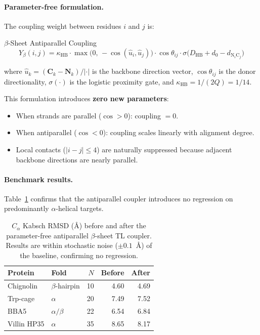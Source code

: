 \paragraph{Parameter-free formulation.}
The coupling weight between residues $i$ and $j$ is:
\begin{resultbox}{$\beta$-Sheet Antiparallel Coupling}
\begin{equation}
    Y_{\beta}(i,j) = \kappa_\text{HB} \cdot
    \max\!\bigl(0,\, -\cos(\hat{u}_i, \hat{u}_j)\bigr) \cdot
    \cos\theta_{ij} \cdot
    \sigma\!\bigl(D_\text{HB} + d_0 - d_{\text{N}_i\text{C}_j}\bigr)
    \label{eq:y_beta}
\end{equation}
\end{resultbox}
where $\hat{u}_k = (\mathbf{C}_k - \mathbf{N}_k)/|\cdot|$ is the backbone
direction vector, $\cos\theta_{ij}$ is the donor directionality,
$\sigma(\cdot)$ is the logistic proximity gate, and
$\kappa_\text{HB} = 1/(2Q) = 1/14$.

This formulation introduces \textbf{zero new parameters}:
\begin{itemize}
    \item When strands are parallel ($\cos > 0$): coupling $= 0$.
    \item When antiparallel ($\cos < 0$): coupling scales linearly
          with alignment degree.
    \item Local contacts ($|i-j| \leq 4$) are naturally suppressed
          because adjacent backbone directions are nearly parallel.
\end{itemize}

\paragraph{Benchmark results.}
Table~\ref{tab:beta_bench} confirms that the antiparallel coupler
introduces no regression on predominantly $\alpha$-helical targets.

\begin{table}[H]
\centering
\caption{$C_\alpha$ Kabsch RMSD (\AA) before and after the
parameter-free antiparallel $\beta$-sheet TL coupler.
Results are within stochastic noise ($\pm 0.1$~\AA) of the
baseline, confirming no regression.}
\label{tab:beta_bench}
\small
\begin{tabular}{@{}l l r r r@{}}
\toprule
\textbf{Protein} & \textbf{Fold} & $N$ &
    \textbf{Before} & \textbf{After} \\
\midrule
Chignolin   & $\beta$-hairpin & 10 & 4.60 & 4.69 \\
Trp-cage    & $\alpha$        & 20 & 7.49 & 7.52 \\
BBA5        & $\alpha/\beta$  & 22 & 6.54 & 6.84 \\
Villin HP35 & $\alpha$        & 35 & 8.65 & 8.17 \\
\bottomrule
\end{tabular}
\end{table}

